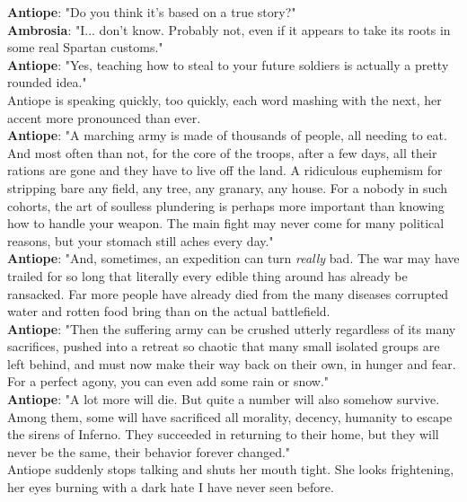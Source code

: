 \documentclass{report}
\newcommand{\speaker}[1]{
	\textbf{#1}: 
}
\begin{document}
\speaker{Antiope} "Do you think it's based on a true story?"\\

\speaker{Ambrosia} "I... don't know. Probably not, even if it appears to take its roots in some real Spartan customs."\\

\speaker{Antiope} "Yes, teaching how to steal to your future soldiers is actually a pretty rounded idea."\\

Antiope is speaking quickly, too quickly, each word mashing with the next, her accent more pronounced than ever.\\

\speaker{Antiope} "A marching army is made of thousands of people, all needing to eat. And most often than not, for the core of the troops, after a few days, all their rations are gone and they have to live off the land. A ridiculous euphemism for stripping bare any field, any tree, any granary, any house. For a nobody in such cohorts, the art of soulless plundering is perhaps more important than knowing how to handle your weapon. The main fight may never come for many political reasons, but your stomach still aches every day."\\

\speaker{Antiope} "And, sometimes, an expedition can turn \emph{really} bad. The war may have trailed for so long that literally every edible thing around has already be ransacked. Far more people have already died from the many diseases corrupted water and rotten food bring than on the actual battlefield.\\

\speaker{Antiope} "Then the suffering army can be crushed utterly regardless of its many sacrifices, pushed into a retreat so chaotic that many small isolated groups are left behind, and must now make their way back on their own, in hunger and fear. For a perfect agony, you can even add some rain or snow."\\

\speaker{Antiope} "A lot more will die. But quite a number will also somehow survive. Among them, some will have sacrificed all morality, decency, humanity to escape the sirens of Inferno. They succeeded in returning to their home, but they will never be the same, their behavior forever changed."\\

Antiope suddenly stops talking and shuts her mouth tight. She looks frightening, her eyes burning with a dark hate I have never seen before.\\
\end{document}
